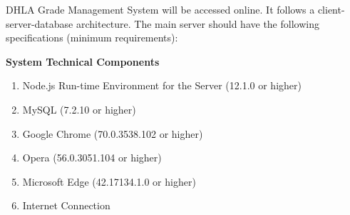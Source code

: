 \documentclass[11pt,a4paper,titlepage]{article}
\begin{document}
DHLA Grade Management System will be accessed online. It follows a client-server-database architecture. The main server should have the following specifications (minimum requirements):

\vspace{1cm}

\textbf{System Technical Components}

\begin{enumerate}
    \item Node.js Run-time Environment for the Server (12.1.0 or higher)
    \item MySQL (7.2.10 or higher)
    \item Google Chrome (70.0.3538.102 or higher)
    \item Opera (56.0.3051.104 or higher)
    \item Microsoft Edge (42.17134.1.0 or higher)
    \item Internet Connection
\end{enumerate}

\clearpage


\end{document}
